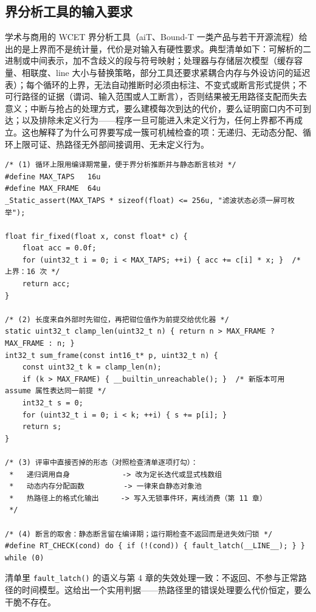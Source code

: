\documentclass[12pt,a4paper,fontset=fandol]{ctexbook}
\newcommand{\Fn}[1]{\texttt{#1()}}
\begin{document}
\subsection{界分析工具的输入要求}

学术与商用的 WCET 界分析工具（aiT、Bound-T 一类产品与若干开源流程）给出的是上界而不是统计量，代价是对输入有硬性要求。典型清单如下：可解析的二进制或中间表示，加不含歧义的段与符号映射；处理器与存储层次模型（缓存容量、相联度、line 大小与替换策略，部分工具还要求紧耦合内存与外设访问的延迟表）；每个循环的上界，无法自动推断时必须由标注、不变式或断言形式提供；不可行路径的证据（谓词、输入范围或人工断言），否则结果被无用路径支配而失去意义；中断与抢占的处理方式，要么建模每次到达的代价，要么证明窗口内不可到达；以及排除未定义行为——程序一旦可能进入未定义行为，任何上界都不再成立。这也解释了为什么可界要写成一簇可机械检查的项：无递归、无动态分配、循环上限可证、热路径无外部间接调用、无未定义行为。

\begin{lstlisting}[style=cstyle,caption={C：把可界性写成可检查项：显式上限、静态断言与不可界结构的排除},label={lst:ch13-bounded}]
/* (1) 循环上限用编译期常量，便于界分析推断并与静态断言核对 */
#define MAX_TAPS   16u
#define MAX_FRAME  64u
_Static_assert(MAX_TAPS * sizeof(float) <= 256u, "滤波状态必须一屏可枚举");

float fir_fixed(float x, const float* c) {
    float acc = 0.0f;
    for (uint32_t i = 0; i < MAX_TAPS; ++i) { acc += c[i] * x; }  /* 上界：16 次 */
    return acc;
}

/* (2) 长度来自外部时先钳位，再把钳位值作为前提交给优化器 */
static uint32_t clamp_len(uint32_t n) { return n > MAX_FRAME ? MAX_FRAME : n; }
int32_t sum_frame(const int16_t* p, uint32_t n) {
    const uint32_t k = clamp_len(n);
    if (k > MAX_FRAME) { __builtin_unreachable(); }  /* 新版本可用 assume 属性表达同一前提 */
    int32_t s = 0;
    for (uint32_t i = 0; i < k; ++i) { s += p[i]; }
    return s;
}

/* (3) 评审中直接否掉的形态（对照检查清单逐项打勾）：
 *   递归调用自身            -> 改为定长迭代或显式栈数组
 *   动态内存分配函数         -> 一律来自静态对象池
 *   热路径上的格式化输出     -> 写入无锁事件环，离线消费（第 11 章）
 */

/* (4) 断言的取舍：静态断言留在编译期；运行期检查不返回而是进失效闩锁 */
#define RT_CHECK(cond) do { if (!(cond)) { fault_latch(__LINE__); } } while (0)
\end{lstlisting}

清单里 \Fn{fault\_latch} 的语义与第 4 章的失效处理一致：不返回、不参与正常路径的时间模型。这给出一个实用判据——热路径里的错误处理要么代价恒定，要么干脆不存在。
\end{document}
